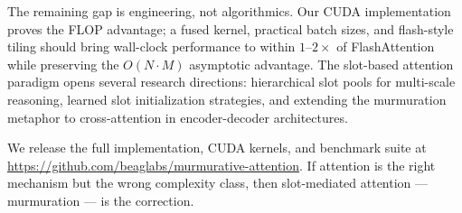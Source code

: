 \documentclass{article}
\begin{document}
The remaining gap is engineering, not algorithmics. Our CUDA implementation proves the FLOP advantage; a fused kernel, practical batch sizes, and flash-style tiling should bring wall-clock performance to within $1$--$2\times$ of FlashAttention while preserving the $O(N \cdot M)$ asymptotic advantage. The slot-based attention paradigm opens several research directions: hierarchical slot pools for multi-scale reasoning, learned slot initialization strategies, and extending the murmuration metaphor to cross-attention in encoder-decoder architectures.

We release the full implementation, CUDA kernels, and benchmark suite at \url{https://github.com/beaglabs/murmurative-attention}. If attention is the right mechanism but the wrong complexity class, then slot-mediated attention — murmuration — is the correction.



\end{document}

